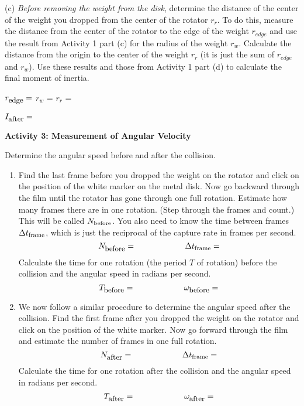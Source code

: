 (c) \textit{Before removing the weight from the disk}, determine the distance of the center of the weight you dropped from the center of the rotator \( r_{r} \). To do this, measure the distance from the center
of the rotator to the edge of the weight \( r_{edge} \) and use the result from Activity 1 part (c) for the radius of the weight \( r_{w} \). Calculate the distance from the origin to the center of the weight \( r_{r} \) (it is just the sum of \( r_{edge} \) and \( r_{w} \)). Use these results and those from Activity 1 part (d) to calculate the final moment of inertia.
\vspace{5mm}

\( r_{\mbox{\small edge}}  =\) \hfill{}\( r_{w} \) = \hfill{}\( r_{r} \) =\hfill{}
\vspace{5mm}

\( I_{\mbox{\small after}} =\)  
\vspace{5mm}

\textbf{Activity 3: Measurement of Angular Velocity}

Determine the angular speed before and after the collision.

\begin{enumerate}
\item Find the last frame before you dropped the weight on the rotator and click on
the position of the white marker on the metal disk. Now go backward through the film until the rotator has gone through one full rotation. Estimate how many frames there are in one rotation. (Step through the frames and count.) This will be called \( N_{\rm before}\). You also need to know the time between frames \( \Delta  t_{\rm frame}\), which is just the reciprocal of the capture rate in frames per second.
\[
N_{\mbox{\small before}}=\qquad \qquad \qquad \Delta t_{\rm frame}=\]
Calculate the time for one rotation (the period $T$ of rotation) before the collision and the angular speed in radians per second.
\[
T_{\mbox{\small before}}=\qquad \qquad \qquad \omega _{\mbox{\small before}}=\]
\item We now follow a similar procedure to determine the angular speed after the collision.
Find the first frame after you dropped the weight on the rotator
and click on the position of the white marker. Now go forward through the film and estimate the number of frames in one full rotation.
\[
N_{\mbox{\small after}}=\qquad \qquad \qquad \Delta t_{\rm frame}=\]
Calculate the time for one rotation after the collision and the angular speed in radians per second.
\[
T_{\mbox{\small after}}=\qquad \qquad \qquad \omega _{\mbox{\small after}}=\]

\end{enumerate}
\vspace{20mm}

